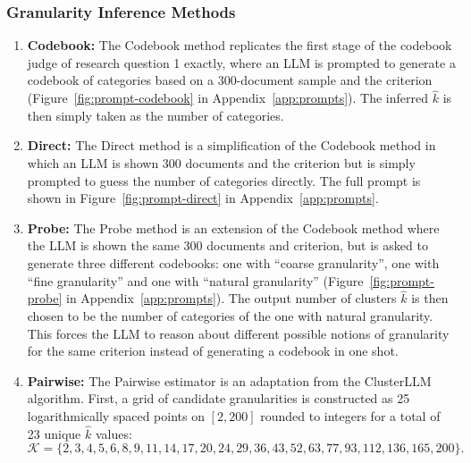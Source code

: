 \documentclass[11pt,a4paper,oneside]{report}
\begin{document}
\subsubsection{Granularity Inference Methods}

\begin{enumerate}
\item \textbf{Codebook:} The Codebook method replicates the first stage of the codebook judge of research question 1 exactly, where an LLM is prompted to generate a codebook of categories based on a 300-document sample and the criterion (Figure~\ref{fig:prompt-codebook} in Appendix~\ref{app:prompts}). The inferred $\hat{k}$ is then simply taken as the number of categories.
\item \textbf{Direct:} The Direct method is a simplification of the Codebook method in which an LLM is shown 300 documents and the criterion but is simply prompted to guess the number of categories directly. The full prompt is shown in Figure~\ref{fig:prompt-direct} in Appendix~\ref{app:prompts}.
\item \textbf{Probe:} The Probe method is an extension of the Codebook method where the LLM is shown the same 300 documents and criterion, but is asked to generate three different codebooks: one with ``coarse granularity'', one with ``fine granularity'' and one with ``natural granularity'' (Figure~\ref{fig:prompt-probe} in Appendix~\ref{app:prompts}). The output number of clusters $\hat{k}$ is then chosen to be the number of categories of the one with natural granularity. This forces the LLM to reason about different possible notions of granularity for the same criterion instead of generating a codebook in one shot.
\item \textbf{Pairwise:} The Pairwise estimator is an adaptation from the ClusterLLM \citep{zhang2023clusterllm} algorithm. First, a grid of candidate granularities is constructed as 25 logarithmically spaced points on $[2, 200]$ rounded to integers for a total of 23 unique $\hat{k}$ values:
\[
\mathcal{K} = \{2, 3, 4, 5, 6, 8, 9, 11, 14, 17, 20, 24, 29, 36, 43, 52, 63, 77, 93, 112, 136, 165, 200\}.
\]

\end{enumerate}
\end{document}

